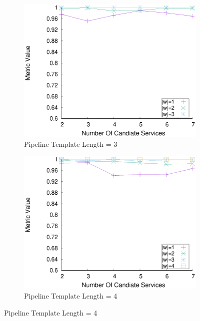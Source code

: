     \begin{figure}[ht!]
      \centering
      \begin{subfigure}{0.49\textwidth}
        \includegraphics[width=\textwidth]{Images/graphs/window_quality_performance_diff_qual_n7_s7_20_100_n3}
        \caption{Pipeline Template Length = 3}
        \label{fig:quality_window_wide_qualitative_n3}
      \end{subfigure}
      \hfill
      \begin{subfigure}{0.49\textwidth}
        \includegraphics[width=\textwidth]{Images/graphs/window_quality_performance_diff_qual_n7_s7_20_100_n4}
        \caption{Pipeline Template Length = 4}

\end{subfigure}
\end{figure}
